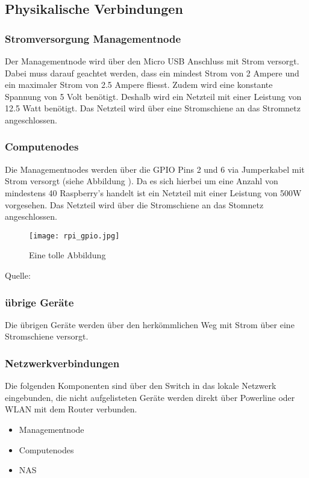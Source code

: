 \subsection{Physikalische Verbindungen}

\subsubsection{Stromversorgung Managementnode}
Der Managementnode wird über den Micro USB Anschluss mit Strom versorgt. Dabei muss darauf geachtet werden, dass ein mindest Strom von 2 Ampere und ein maximaler Strom von 2.5 Ampere fliesst. Zudem wird eine konstante Spannung von 5 Volt benötigt. Deshalb wird ein Netzteil mit einer Leistung von 12.5 Watt benötigt. Das Netzteil wird über eine Stromschiene an das Stromnetz angeschlossen.

\subsubsection{Computenodes}
Die Managementnodes werden über die GPIO Pins 2 und 6 via Jumperkabel mit Strom versorgt (siehe Abbildung ). Da es sich hierbei um eine Anzahl von mindestens 40 Raspberry's handelt ist ein Netzteil mit einer Leistung von 500W vorgesehen. Das Netzteil wird über die Stromschiene an das Stomnetz angeschlossen.

\begin{figure}[H]
\centering
\texttt{[image: rpi\_gpio.jpg]}
\caption{Eine tolle Abbildung \citep[Quelle:]{https://developer-blog.net/wp-content/uploads/2013/09/raspberry-pi-rev2-gpio-pinout-1024x715.jpg}} 
\label{fig:GPIO Anschlüsse}
\end{figure} 

Quelle: 

\subsubsection{übrige Geräte}
Die übrigen Geräte werden über den herkömmlichen Weg mit Strom über eine Stromschiene versorgt.

\subsubsection{Netzwerkverbindungen}
Die folgenden Komponenten sind über den Switch in das lokale Netzwerk eingebunden, die nicht aufgelisteten Geräte werden direkt über Powerline oder WLAN mit dem Router verbunden.
\begin{itemize}
\item Managementnode
\item Computenodes
\item NAS
\end{itemize}


